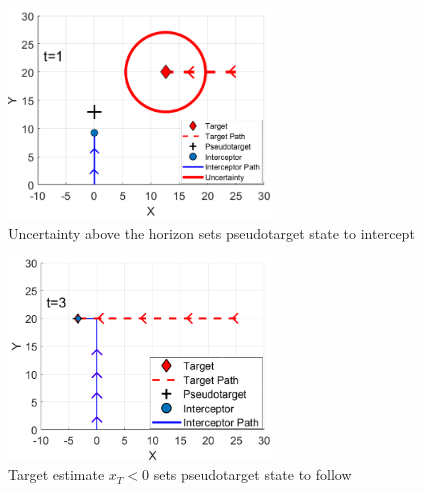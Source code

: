 \documentclass[conference]{IEEEtran}
\begin{document}
\begin{figure}[H]
	\centering
	\includegraphics[width=7cm]{intercept}
	\caption{Uncertainty above the horizon sets pseudotarget state to intercept}
	\label{fig:intercept}
\end{figure}

\begin{figure}[H]
	\centering
	\includegraphics[width=7cm]{follow}
	\caption{Target estimate $x_T < 0$ sets pseudotarget state to follow}
	\label{fig:follow}
\end{figure}


\end{document}
